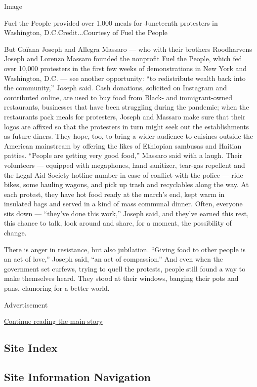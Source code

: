 Image

Fuel the People provided over 1,000 meals for Juneteenth protesters in
Washington, D.C.Credit...Courtesy of Fuel the People

But Gaïana Joseph and Allegra Massaro --- who with their brothers
Roodharvens Joseph and Lorenzo Massaro founded the nonprofit Fuel the
People, which fed over 10,000 protesters in the first few weeks of
demonstrations in New York and Washington, D.C. --- see another
opportunity: ``to redistribute wealth back into the community,'' Joseph
said. Cash donations, solicited on Instagram and contributed online, are
used to buy food from Black- and immigrant-owned restaurants, businesses
that have been struggling during the pandemic; when the restaurants pack
meals for protesters, Joseph and Massaro make sure that their logos are
affixed so that the protesters in turn might seek out the establishments
as future diners. They hope, too, to bring a wider audience to cuisines
outside the American mainstream by offering the likes of Ethiopian
sambusas and Haitian patties. ``People are getting very good food,''
Massaro said with a laugh. Their volunteers --- equipped with
megaphones, hand sanitizer, tear-gas repellent and the Legal Aid Society
hotline number in case of conflict with the police --- ride bikes, some
hauling wagons, and pick up trash and recyclables along the way. At each
protest, they have hot food ready at the march's end, kept warm in
insulated bags and served in a kind of mass communal dinner. Often,
everyone sits down --- ``they've done this work,'' Joseph said, and
they've earned this rest, this chance to talk, look around and share,
for a moment, the possibility of change.

There is anger in resistance, but also jubilation. ``Giving food to
other people is an act of love,'' Joseph said, ``an act of compassion.''
And even when the government set curfews, trying to quell the protests,
people still found a way to make themselves heard. They stood at their
windows, banging their pots and pans, clamoring for a better world.

Advertisement

\protect\hyperlink{after-bottom}{Continue reading the main story}

\hypertarget{site-index}{%
\subsection{Site Index}\label{site-index}}

\hypertarget{site-information-navigation}{%
\subsection{Site Information
Navigation}\label{site-information-navigation}}

